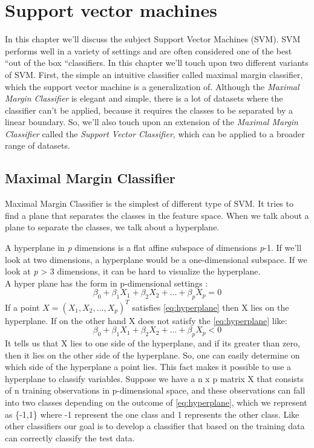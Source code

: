 
\chapter{Support vector machines}
In this chapter we’ll discuss the subject Support Vector Machines (SVM). SVM performs well in a variety of settings and are often considered one of the best “out of the box “classifiers.  In this chapter we’ll touch upon two different variants of SVM. First, the simple an intuitive classifier called maximal margin classifier, which the support vector machine is a generalization of. Although the \textit{Maximal Margin Classifier} is elegant and simple, there is a lot of datasets where the classifier can’t be applied, because it requires the classes to be separated by a linear boundary. So, we’ll also touch upon an extension of the \textit{Maximal Margin Classifier} called the \textit{Support Vector Classifier}, which can be applied to a broader range of datasets. 

\section{Maximal Margin Classifier}
Maximal Margin Classifier is the simplest of different type of SVM. It tries to find a plane that separates the classes in the feature space. When we talk about a plane to separate the classes, we talk about a hyperplane. 

A hyperplane in \textit{p} dimensions is a flat affine subspace of dimensions \textit{p}-1. If we’ll look at two dimensions, a hyperplane would be a one-dimensional subspace. If we look at \textit{p} > 3 dimensions, it can be hard to visualize the hyperplane. \\
A hyper plane has the form in p-dimensional settings \cite{book_2015}: 
\begin{equation}
\beta_0 + \beta_1 X_1 + \beta_2 X_2 +...+ \beta_p X_p = 0\label{eq:hyperplane}
\end{equation}
If a point $X = (X_1 , X_2 ,..., X_p)^T$ satisfies \cref{eq:hyperplane} then X lies on the hyperplane. If on the other hand X does not satisfy the \cref{eq:hyperplane} like: 
\begin{equation}
\beta_0 + \beta_1 X_1 + \beta_2 X_2 +...+ \beta_p X_p < 0\label{ eq:hyperplane1 }
\end{equation}
It tells us that X lies to one side of the hyperplane, and if its greater than zero, then it lies on the other side of the hyperplane. So, one can easily determine on which side of the hyperplane a point lies. This fact makes it possible to use a hyperplane to classify variables. 
Suppose we have a n x p matrix X that consists of n training observations in p-dimensional space, and these observations can fall into two classes depending on the outcome of  \cref{eq:hyperplane}, which we represent as \{-1,1\} where -1 represent the one class and 1 represents the other class. 
Like other classifiers our goal is to develop a classifier that based on the training data can correctly classify the test data. 

